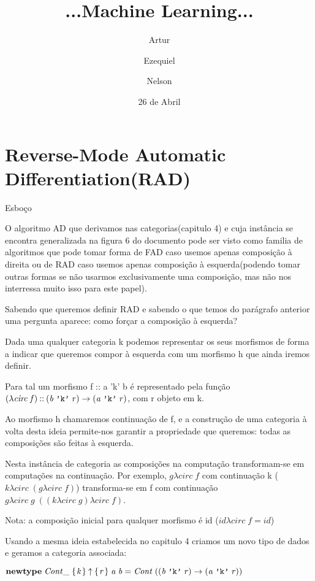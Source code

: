 \documentclass{beamer}
\title
{...Machine Learning...}
\author[Artur, Ezequiel, Nelson] 
{Artur \and Ezequiel \and Nelson}
\institute
{Universidade do Minho}
\date
{26 de Abril}
\newcommand{\Conid}[1]{\mathit{#1}}
\newcommand{\Varid}[1]{\mathit{#1}}
\begin{document}
\section{Reverse-Mode Automatic Differentiation(RAD)}
\begin{frame}{Esboço}

O algoritmo AD que derivamos nas categorias(capitulo 4) e cuja instância se encontra generalizada na
figura 6 do documento pode ser visto como familia de algoritmos que pode tomar forma de FAD caso usemos
apenas composição à direita ou de RAD caso usemos apenas composição à esquerda(podendo tomar outras formas
se não usarmos exclusivamente uma composição, mas não nos interressa muito isso para este papel).

Sabendo que queremos definir RAD e sabendo o que temos do parágrafo anterior uma pergunta aparece:
como forçar a composição à esquerda?

Dada uma qualquer categoria k podemos representar os seus morfismos de forma a indicar
que queremos compor à esquerda com um morfismo h que ainda iremos definir.

Para tal um morfismo f :: a 'k' b é representado pela função \ensuremath{(\lambda \Varid{circ}\;\Varid{f})\mathbin{::}(\Varid{b}\;\text{\tt 'k'}\;\Varid{r})\rightarrow (\Varid{a}\;\text{\tt 'k'}\;\Varid{r})},
com r objeto em k.

Ao morfismo h chamaremos continuação de f, e a construção de uma categoria à volta desta ideia
permite-nos garantir a propriedade que queremos: todas as composições são feitas à esquerda.

Nesta instância de categoria as composições na computação transformam-se em computações na continuação.
Por exemplo, \ensuremath{\Varid{g}\lambda \Varid{circ}\;\Varid{f}} com continuação k (\ensuremath{\Varid{k}\lambda \Varid{circ}\;(\Varid{g}\lambda \Varid{circ}\;\Varid{f})}) transforma-se em f com continuação
\ensuremath{\Varid{g}\lambda \Varid{circ}\;\Varid{g}\;((\Varid{k}\lambda \Varid{circ}\;\Varid{g})\lambda \Varid{circ}\;\Varid{f})}.

Nota: a composição inicial para qualquer morfismo é id (\ensuremath{\Varid{id}\lambda \Varid{circ}\;\Varid{f}\mathrel{=}\Varid{id}})

Usando a mesma ideia estabelecida no capitulo 4 criamos um novo tipo de dados e geramos a categoria associada:

\ensuremath{\mathbf{newtype}\;\Conid{Cont\char95 }\;\{\mskip1.5mu \Varid{k}\mskip1.5mu\}\mathbin{\uparrow}\{\mskip1.5mu \Varid{r}\mskip1.5mu\}\;\Varid{a}\;\Varid{b}\mathrel{=}\Conid{Cont}\;((\Varid{b}\;\text{\tt 'k'}\;\Varid{r})\rightarrow (\Varid{a}\;\text{\tt 'k'}\;\Varid{r}))}


\end{frame}
\end{document}
